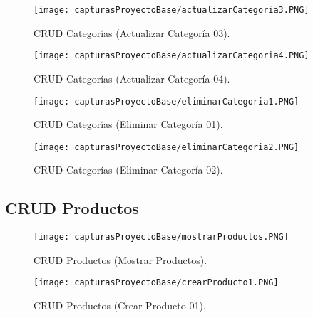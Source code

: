 \documentclass[titlepage, 12pt]{article}
\begin{document}
    \begin{figure}[h]
        \caption{CRUD Categorías (Actualizar Categoría 03).}
        \centering
        \texttt{[image: capturasProyectoBase/actualizarCategoria3.PNG]} \par\vspace{0.5cm}
    \end{figure}
    
    \clearpage
    
    \begin{figure}[h]
        \caption{CRUD Categorías (Actualizar Categoría 04).}
        \centering
        \texttt{[image: capturasProyectoBase/actualizarCategoria4.PNG]} \par\vspace{0.5cm}
    \end{figure}
    
    \begin{figure}[h]
        \caption{CRUD Categorías (Eliminar Categoría 01).}
        \centering
        \texttt{[image: capturasProyectoBase/eliminarCategoria1.PNG]} \par\vspace{0.5cm}
    \end{figure}
    
    \clearpage
    
    \begin{figure}[h]
        \caption{CRUD Categorías (Eliminar Categoría 02).}
        \centering
        \texttt{[image: capturasProyectoBase/eliminarCategoria2.PNG]} \par\vspace{0.5cm}
    \end{figure}

\subsection{CRUD Productos}
    \begin{figure}[h]
        \caption{CRUD Productos (Mostrar Productos).}
        \centering
        \texttt{[image: capturasProyectoBase/mostrarProductos.PNG]} \par\vspace{0.5cm}
    \end{figure}
    
    \clearpage
    
    \begin{figure}[h]
        \caption{CRUD Productos (Crear Producto 01).}
        \centering
        \texttt{[image: capturasProyectoBase/crearProducto1.PNG]} \par\vspace{0.5cm}
    \end{figure}
    
\end{document}
